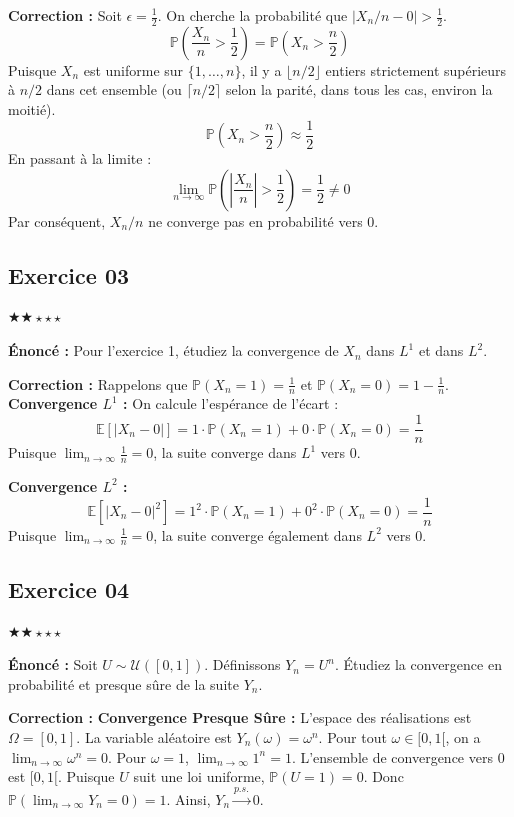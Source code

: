 \documentclass[11pt,a4paper]{article}
\begin{document}
\textbf{Correction :}
Soit $\epsilon = \frac{1}{2}$. On cherche la probabilité que $|X_n/n - 0| > \frac{1}{2}$.
$$ \mathbb{P}\left(\frac{X_n}{n} > \frac{1}{2}\right) = \mathbb{P}\left(X_n > \frac{n}{2}\right) $$
Puisque $X_n$ est uniforme sur $\{1, \dots, n\}$, il y a $\lfloor n/2 \rfloor$ entiers strictement supérieurs à $n/2$ dans cet ensemble (ou $\lceil n/2 \rceil$ selon la parité, dans tous les cas, environ la moitié).
$$ \mathbb{P}\left(X_n > \frac{n}{2}\right) \approx \frac{1}{2} $$
En passant à la limite :
$$ \lim_{n \to \infty} \mathbb{P}\left(\left| \frac{X_n}{n} \right| > \frac{1}{2}\right) = \frac{1}{2} \neq 0 $$
Par conséquent, $X_n/n$ ne converge pas en probabilité vers $0$.


\subsection*{Exercice 03}

\quad $\bigstar\bigstar\star\star\star$

\textbf{Énoncé :}
Pour l'exercice 1, étudiez la convergence de $X_n$ dans $L^1$ et dans $L^2$.

\textbf{Correction :}
Rappelons que $\mathbb{P}(X_n = 1) = \frac{1}{n}$ et $\mathbb{P}(X_n = 0) = 1 - \frac{1}{n}$.
\textbf{Convergence $L^1$ :}
On calcule l'espérance de l'écart :
$$ \mathbb{E}[|X_n - 0|] = 1 \cdot \mathbb{P}(X_n = 1) + 0 \cdot \mathbb{P}(X_n = 0) = \frac{1}{n} $$
Puisque $\lim_{n \to \infty} \frac{1}{n} = 0$, la suite converge dans $L^1$ vers $0$.

\textbf{Convergence $L^2$ :}
$$ \mathbb{E}[|X_n - 0|^2] = 1^2 \cdot \mathbb{P}(X_n = 1) + 0^2 \cdot \mathbb{P}(X_n = 0) = \frac{1}{n} $$
Puisque $\lim_{n \to \infty} \frac{1}{n} = 0$, la suite converge également dans $L^2$ vers $0$.


\subsection*{Exercice 04}

\quad $\bigstar\bigstar\star\star\star$

\textbf{Énoncé :}
Soit $U \sim \mathcal{U}([0,1])$. Définissons $Y_n = U^n$.
Étudiez la convergence en probabilité et presque sûre de la suite $Y_n$.

\textbf{Correction :}
\textbf{Convergence Presque Sûre :}
L'espace des réalisations est $\Omega = [0, 1]$. La variable aléatoire est $Y_n(\omega) = \omega^n$.
Pour tout $\omega \in [0, 1[$, on a $\lim_{n \to \infty} \omega^n = 0$.
Pour $\omega = 1$, $\lim_{n \to \infty} 1^n = 1$.
L'ensemble de convergence vers $0$ est $[0, 1[$. Puisque $U$ suit une loi uniforme, $\mathbb{P}(U = 1) = 0$.
Donc $\mathbb{P}\left(\lim_{n \to \infty} Y_n = 0\right) = 1$.
Ainsi, $Y_n \xrightarrow{p.s.} 0$.
\end{document}

